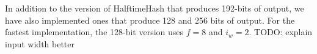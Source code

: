 \documentclass[acmsmall, nonacm]{acmart}
\begin{document}





In addition to the version of HalftimeHash that produces 192-bits of output, we have also implemented ones that produce 128 and 256 bits of output.
For the fastest implementation, the 128-bit version uses $f = 8$ and $i_w = 2$.
TODO: explain input width better

\end{document}
